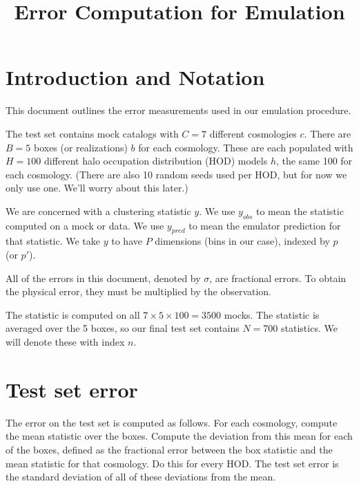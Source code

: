 \documentclass[12pt]{article}
\title{Error Computation for Emulation}
\begin{document}
\maketitle

\section{Introduction and Notation}

This document outlines the error measurements used in our emulation procedure.

The test set contains mock catalogs with $C=7$ different cosmologies $c$. 
There are $B=5$ boxes (or realizations) $b$ for each cosmology. 
These are each populated with $H=100$ different halo occupation distribution (HOD) models $h$, the same 100 for each cosmology. 
(There are also 10 random seeds used per HOD, but for now we only use one. We'll worry about this later.)

We are concerned with a clustering statistic $y$. 
We use $y_{obs}$ to mean the statistic computed on a mock or data. 
We use $y_{pred}$ to mean the emulator prediction for that statistic. 
We take $y$ to have $P$ dimensions (bins in our case), indexed by $p$ (or $p'$).

All of the errors in this document, denoted by $\sigma$,  are fractional errors.
To obtain the physical error, they must be multiplied by the observation. 

The statistic is computed on all $7 \times 5 \times 100 = 3500$ mocks. 
The statistic is averaged over the 5 boxes, so our final test set contains $N=700$ statistics. 
We will denote these with index $n$.

\section{Test set error}

The error on the test set is computed as follows. 
For each cosmology, compute the mean statistic over the boxes.
Compute the deviation from this mean for each of the boxes, defined as the fractional error between the box statistic and the mean statistic for that cosmology. 
Do this for every HOD. 
The test set error is the standard deviation of all of these deviations from the mean.
\end{document}
